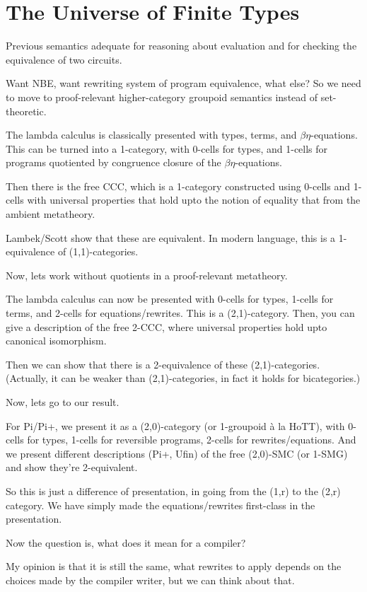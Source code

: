 \section{The Universe of Finite Types}
\label{sec:ufin}

Previous semantics adequate for reasoning about evaluation and for checking the equivalence of two circuits.

Want NBE, want rewriting system of program equivalence, what else? So we need to move to proof-relevant higher-category
groupoid semantics instead of set-theoretic.

The lambda calculus is classically presented with types, terms, and
$\beta\eta$-equations. This can be turned into a 1-category, with 0-cells for
types, and 1-cells for programs quotiented by congruence closure of the
$\beta\eta$-equations.

Then there is the free CCC, which is a 1-category constructed using
0-cells and 1-cells with universal properties that hold upto the notion
of equality that from the ambient metatheory.

Lambek/Scott show that these are equivalent. In modern language, this is
a 1-equivalence of (1,1)-categories.

Now, lets work without quotients in a proof-relevant metatheory.

The lambda calculus can now be presented with 0-cells for types, 1-cells
for terms, and 2-cells for equations/rewrites. This is a
(2,1)-category. Then, you can give a description of the free 2-CCC,
where universal properties hold upto canonical isomorphism.

Then we can show that there is a 2-equivalence of these
(2,1)-categories. (Actually, it can be weaker than (2,1)-categories, in
fact it holds for bicategories.)

Now, lets go to our result.

For Pi/Pi+, we present it as a (2,0)-category (or 1-groupoid à la HoTT),
with 0-cells for types, 1-cells for reversible programs, 2-cells for
rewrites/equations. And we present different descriptions (Pi+, Ufin)
of the free (2,0)-SMC (or 1-SMG) and show they're 2-equivalent.

So this is just a difference of presentation, in going from the (1,r) to
the (2,r) category. We have simply made the equations/rewrites
first-class in the presentation.

Now the question is, what does it mean for a compiler?

My opinion is that it is still the same, what rewrites to apply depends
on the choices made by the compiler writer, but we can think about that.

